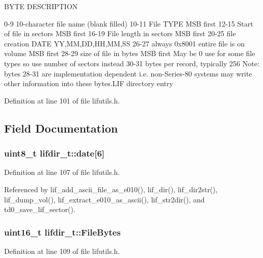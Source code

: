 B\+Y\+TE D\+E\+S\+C\+R\+I\+P\+T\+I\+ON 

 0-\/9 10-\/character file name (blank filled) 10-\/11 File T\+Y\+PE M\+SB first 12-\/15 Start of file in sectors M\+SB first 16-\/19 File length in sectors M\+SB first 20-\/25 file creation D\+A\+TE YY,MM,DD,HH,MM,SS 26-\/27 always 0x8001 entire file is on volume M\+SB first 28-\/29 size of file in bytes M\+SB first May be 0 use for some file types so use number of sectors instead 30-\/31 bytes per record, typically 256 Note\+: bytes 28-\/31 are implementation dependent i.\+e. non-\/\+Series-\/80 systems may write other information into these bytes.\+L\+IF directory entry 

Definition at line 101 of file lifutils.\+h.



\subsection{Field Documentation}
\subsubsection[{\texorpdfstring{date}{date}}]{\setlength{\rightskip}{0pt plus 5cm}uint8\+\_\+t lifdir\+\_\+t\+::date\mbox{[}6\mbox{]}}\hypertarget{structlifdir__t_afb6d03670642d3bf86f460ae246ceb0b}{}\label{structlifdir__t_afb6d03670642d3bf86f460ae246ceb0b}


Definition at line 107 of file lifutils.\+h.



Referenced by lif\+\_\+add\+\_\+ascii\+\_\+file\+\_\+as\+\_\+e010(), lif\+\_\+dir(), lif\+\_\+dir2str(), lif\+\_\+dump\+\_\+vol(), lif\+\_\+extract\+\_\+e010\+\_\+as\+\_\+ascii(), lif\+\_\+str2dir(), and td0\+\_\+save\+\_\+lif\+\_\+sector().

\subsubsection[{\texorpdfstring{File\+Bytes}{FileBytes}}]{\setlength{\rightskip}{0pt plus 5cm}uint16\+\_\+t lifdir\+\_\+t\+::\+File\+Bytes}\hypertarget{structlifdir__t_a6e2414bf7966358862b59c5eaf3903f2}{}\label{structlifdir__t_a6e2414bf7966358862b59c5eaf3903f2}


Definition at line 109 of file lifutils.\+h.



